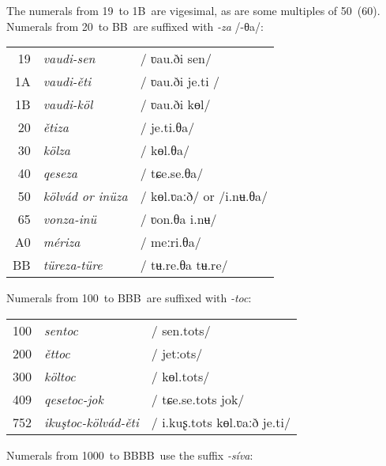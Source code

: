 \documentclass[grammar]{subfiles}
\begin{document}
	\newpage
	The numerals from 19\duo\ to 1B\duo\ are vigesimal, as are some multiples of 50\duo\ (60\dec). Numerals from 20\duo\ to BB\duo\ are suffixed with \emph{-za} /-θa/:

	\begin{exe}
		\ex
		\begin{tabular}[t]{r >{\itshape}l >{/}l<{/}}
			19\duo & vaudi-sen & ʋau.ði sen\\
			1A\duo & vaudi-ěti & ʋau.ði je.ti \\
			1B\duo & vaudi-köl & ʋau.ði kɵl\\
			20\duo & ětiza & je.ti.θa\\
			30\duo & kölza & kɵl.θa\\
			40\duo & qeseza & tɕe.se.θa\\
			50\duo & kölvád \textup{or} inüza & kɵl.ʋaːð/ or /i.nʉ.θa\\
			65\duo & vonza-inü & ʋon.θa i.nʉ\\
			A0\duo & mériza & meːri.θa\\
			BB\duo & türeza-türe & tʉ.re.θa tʉ.re\\
		\end{tabular}
	\end{exe}

	Numerals from 100\duo\ to BBB\duo\ are suffixed with \emph{-toc}:

	\begin{exe}
		\ex
		\begin{tabular}[t]{r >{\itshape}l >{/}l<{/}}
			100\duo & sentoc & sen.tots\\
			200\duo & ěttoc & jetːots\\
			300\duo & költoc & kɵl.tots\\
			409\duo & qesetoc-jok & tɕe.se.tots jok\\
			752\duo & ikuştoc-kölvád-ěti & i.kuʂ.tots kɵl.ʋaːð je.ti\\
		\end{tabular}
	\end{exe}

	Numerals from 1000\duo\ to BBBB\duo\  use the suffix \emph{-síva}:
\end{document}
